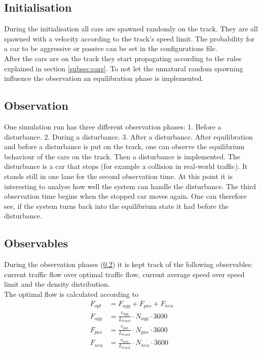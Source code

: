 \documentclass[11pt,a4paper,twocolumn]{article}
\begin{document}
\subsection{Initialisation} \label{subsec:initialisation}
During the initialisation all cars are spawned randomly on the track. They are all spawned with a velocity according to the track's speed limit. The probability for a car to be aggressive or passive can be set in the configurations file. \\
After the cars are on the track they start propagating according to the rules explained in section \ref{subsec:cars}. To not let the unnatural random spawning influence the observation an equilibration phase is implemented.

\subsection{Observation} \label{subsec:observation}
One simulation run has three different observation phases: 1. Before a disturbance. 2. During a disturbance. 3. After a disturbance.
After equilibration and before a disturbance is put on the track, one can observe the equilibrium behaviour of the cars on the track. Then a disturbance is implemented. The disturbance is a car that stops (for example a collision in real-world traffic). It stands still in one lane for the second observation time. At this point it is interesting to analyse how well the system can handle the disturbance. The third observation time begins when the stopped car moves again. One can therefore see, if the system turns back into the equilibrium state it had before the disturbance. \\

\subsection{Observables} \label{subsec:observables}

During the observation phases (\ref{subsec:observation}) it is kept track of the following observables: current traffic flow over optimal traffic flow, current average speed over speed limit and the density distribution. \\
The optimal flow is calculated according to
\begin{align*}
F_{opt} &= F_{agg} + F_{pas} + F_{neu} \\
F_{agg} &= \frac{v_{agg}}{L_{track}} \cdot N_{agg} \cdot 3600 \\
F_{pas} &= \frac{v_{pas}}{L_{track}} \cdot N_{pas} \cdot 3600 \\
F_{neu} &= \frac{v_{neu}}{L_{track}} \cdot N_{neu} \cdot 3600 \\
\end{align*}
\end{document}
